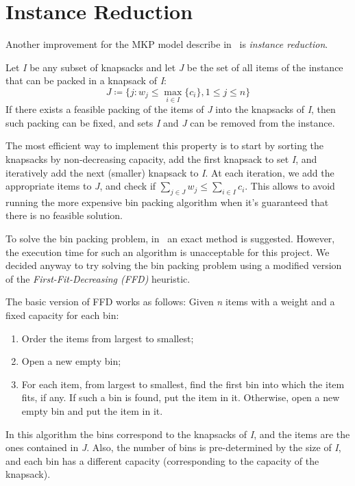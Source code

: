 \section{Instance Reduction}
Another improvement for the MKP model describe in~\cite{mkp:2019} is
\textit{instance reduction}.

Let \textit{I} be any subset of knapsacks and let \textit{J} be the set of
all items of the instance that can be packed in a knapsack of \textit{I}:
\begin{equation}
    J \coloneqq \{j:w_{j} \leq \max_{i \in I} \{c_{i}\}, 1 \leq j \leq n\}
\end{equation}
If there exists a feasible packing of the items of \textit{J} into the knapsacks
of \textit{I}, then such packing can be fixed, and sets \textit{I} and \textit{J}
can be removed from the instance.

The most efficient way to implement this property is to start
by sorting the knapsacks by non-decreasing capacity, add the first knapsack
to set \textit{I}, and iteratively add the next (smaller) knapsack to \textit{I}.
At each iteration, we add the appropriate items to \textit{J},
and check if \(\sum_{j \in J} w_{j} \leq \sum_{i \in I} c_{i}\).
This allows to avoid running the more expensive bin packing algorithm
when it's guaranteed that there is no feasible solution.

To solve the bin packing problem, in~\cite{mkp:2019} an exact method is suggested.
However, the execution time for such an algorithm is unacceptable for this project.
We decided anyway to try solving the bin packing problem using a modified
version of the \textit{First-Fit-Decreasing (FFD)} heuristic.

The basic version of FFD works as follows:
Given \textit{n} items with a weight and a fixed capacity for each bin:
\begin{enumerate}
    \item Order the items from largest to smallest;
    \item Open a new empty bin;
    \item For each item, from largest to smallest, find the first bin into which the item fits, if any.
    If such a bin is found, put the item in it.
    Otherwise, open a new empty bin and put the item in it.
\end{enumerate}

In this algorithm the bins correspond to the knapsacks of \textit{I},
and the items are the ones contained in \textit{J}.
Also, the number of bins is pre-determined by the size of \textit{I},
and each bin has a different capacity (corresponding to the capacity of the knapsack).


